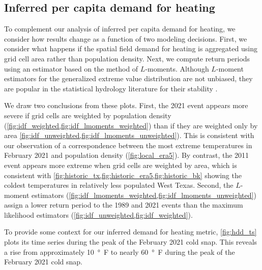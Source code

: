 \documentclass[12pt]{iopart}
\begin{document}
\subsection{Inferred per capita demand for heating}

To complement our analysis of inferred per capita demand for heating, we consider how results change as a function of two modeling decisions.
First, we consider what happens if the spatial field demand for heating is aggregated using grid cell area rather than population density.
Next, we compute return periods using an estimator based on the method of $L$-moments.
Although $L$-moment estimators for the generalized extreme value distribution are not unbiased, they are popular in the statistical hydrology literature for their stability \cite{hosking_gev:1985,martins_gev:2001,morrison_gev:2002}.

We draw two conclusions from these plots.
First, the 2021 event appears more severe if grid cells are weighted by population density (\cref{fig:idf_weighted,fig:idf_lmoments_weighted}) than if they are weighted only by area \cref{fig:idf_unweighted,fig:idf_lmoments_unweighted}).
This is consistent with our observation of a correspondence between the most extreme temperatures in February 2021 and population density (\cref{fig:local_era5}).
By contrast, the 2011 event appears more extreme when grid cells are weighted by area, which is consistent with \cref{fig:historic_tx,fig:historic_era5,fig:historic_bk} showing the coldest temperatures in relatively less populated West Texas.
Second, the $L$-moment estimators (\cref{fig:idf_lmoments_weighted,fig:idf_lmoments_unweighted}) assign a lower return period to the 1989 and 2021 events than the maximum likelihood estimators (\cref{fig:idf_unweighted,fig:idf_weighted}).

To provide some context for our inferred demand for heating metric, \cref{fig:hdd_ts} plots its time series during the peak of the February 2021 cold snap.
This reveals a rise from approximately \SI{10}{\degree F} to nearly \SI{60}{\degree F} during the peak of the February 2021 cold snap.
\end{document}
